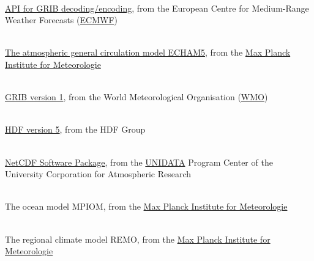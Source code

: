 \begin{thebibliography}{xx}

 \ \\
  \href{https://software.ecmwf.int/wiki/display/ECC/ecCodes+Home}
       {API for GRIB decoding/encoding},
  from the European Centre for Medium-Range Weather Forecasts
  (\href{http://www.ecmwf.int}{ECMWF})


 \ \\
  \href{https://www.mpimet.mpg.de/fileadmin/publikationen/Reports/max_scirep_349.pdf}
       {The atmospheric general circulation model ECHAM5},
  from the
  \href{https://www.mpimet.mpg.de}
       {Max Planck Institute for Meteorologie}


 \ \\
  \href{http://www.wmo.ch/web/www/WMOCodes/Guides/GRIB/GRIB1-Contents.html}
       {GRIB version 1},
  from the World Meteorological Organisation
  (\href{http://www.wmo.ch}{WMO})


 \ \\
  \href{http://hdf.ncsa.uiuc.edu/HDF5/}
       {HDF version 5},
  from the HDF Group


 \ \\
  \href{http://www.unidata.ucar.edu/packages/netcdf}{NetCDF Software Package},
  from the
  \href{http://www.unidata.ucar.edu}{UNIDATA}
  Program Center of the University Corporation for Atmospheric Research


 \ \\
  The ocean model MPIOM,
  from the
  \href{https://www.mpimet.mpg.de}
       {Max Planck Institute for Meteorologie}


 \ \\
  The regional climate model REMO,
  from the
  \href{https://www.mpimet.mpg.de}
       {Max Planck Institute for Meteorologie}

\end{thebibliography}
